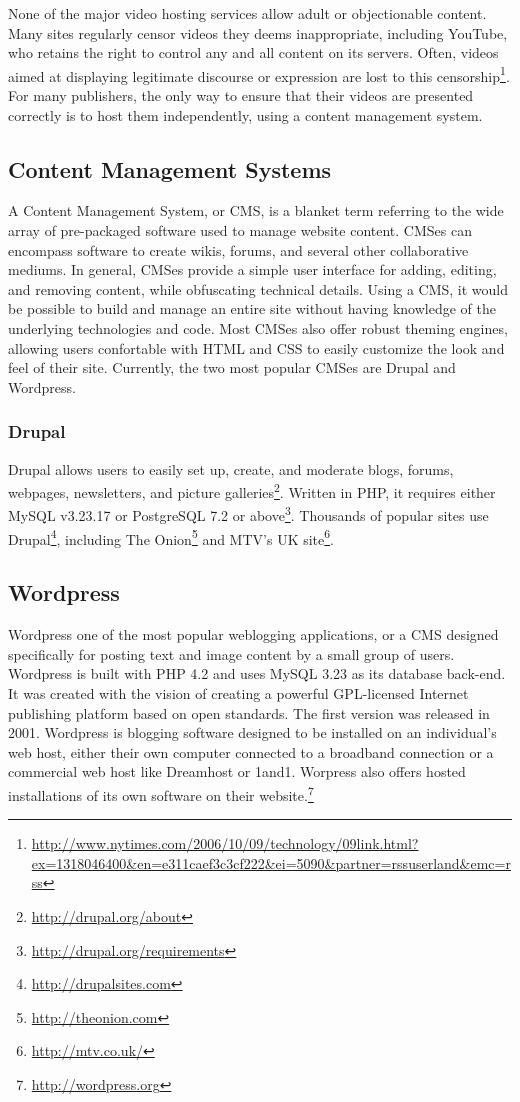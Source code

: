 \documentclass[a4paper,12pt]{report}
\begin{document}
None of the major video hosting services allow adult or objectionable content.
Many sites regularly censor videos they deems inappropriate, including YouTube, who retains the right to control any and all content on its servers.
Often, videos aimed at displaying legitimate discourse or expression are lost to this censorship\footnote{\url{http://www.nytimes.com/2006/10/09/technology/09link.html?ex=1318046400&en=e311caef3c3cf222&ei=5090&partner=rssuserland&emc=rss}}.
For many publishers, the only way to ensure that their videos are presented correctly is to host them independently, using a content management system.

\subsection{Content Management Systems}

A Content Management System, or CMS, is a blanket term referring to the wide array of pre-packaged software used to manage website content. CMSes can encompass software to create wikis, forums, and several other collaborative mediums. In general, CMSes provide a simple user interface for adding, editing, and removing content, while obfuscating technical details. Using a CMS, it would be possible to build and manage an entire site without having knowledge of the underlying technologies and code. Most CMSes also offer robust theming engines, allowing users confortable with HTML and CSS to easily customize the look and feel of their site. Currently, the two most popular CMSes are Drupal and Wordpress.

\subsubsection{Drupal}
Drupal allows users to easily set up, create, and moderate blogs, forums, webpages, newsletters, and picture galleries\footnote{\url{http://drupal.org/about}}.
Written in PHP, it requires either MySQL v3.23.17 or PostgreSQL 7.2 or above\footnote{\url{http://drupal.org/requirements}}.
Thousands of popular sites use Drupal\footnote{\url{http://drupalsites.com}}, including The Onion\footnote{\url{http://theonion.com}} and MTV's UK site\footnote{\url{http://mtv.co.uk/}}.

\subsection{Wordpress}
Wordpress one of the most popular weblogging applications, or a CMS designed specifically for posting text and image content by a small group of users.
Wordpress is built with PHP 4.2 and uses MySQL 3.23 as its database back-end. 
It was created with the vision of creating a powerful GPL-licensed Internet publishing platform based on open standards. 
The first version was released in 2001. 
Wordpress is blogging software designed to be installed on an individual's web host, either their own computer connected to a broadband connection or a commercial web host like Dreamhost or 1and1. Worpress also offers hosted installations of its own software on their website.\footnote{\url{http://wordpress.org}}
\end{document}
